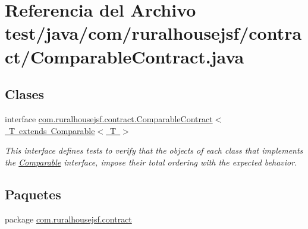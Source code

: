 \hypertarget{a00083}{}\section{Referencia del Archivo test/java/com/ruralhousejsf/contract/\+Comparable\+Contract.java}
\label{a00083}
\subsection*{Clases}
\begin{DoxyCompactItemize}
\item 
interface \mbox{\hyperlink{a00236}{com.\+ruralhousejsf.\+contract.\+Comparable\+Contract$<$ T extends Comparable$<$ T $>$}}
\begin{DoxyCompactList}\small\item\em This interface defines tests to verify that the objects of each class that implements the \mbox{\hyperlink{}{Comparable}} interface, impose their total ordering with the expected behavior. \end{DoxyCompactList}\end{DoxyCompactItemize}
\subsection*{Paquetes}
\begin{DoxyCompactItemize}
\item 
package \mbox{\hyperlink{a00123}{com.\+ruralhousejsf.\+contract}}
\end{DoxyCompactItemize}
